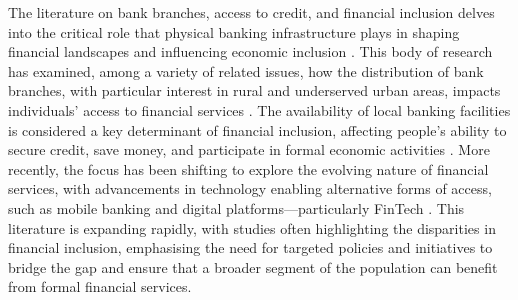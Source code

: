 \documentclass[a4paper,11pt,oneside]{article}
\begin{document}



The literature on bank branches, access to credit, and financial inclusion delves into the critical role that physical banking infrastructure plays in shaping financial landscapes and influencing economic inclusion \citep{avery1991deregulation,beck_demirguc_maksimovic_jmcb,jayartne-strahan-qje96,ergungor2010bank,Brevoort2009,crosignani2025financial}. This body of research has examined, among a variety of related issues, how the distribution of bank branches, with particular interest in rural and underserved urban areas, impacts individuals' access to financial services \citep{solo2006access,anderloni2007access}. The availability of local banking facilities is considered a key determinant of financial inclusion, affecting people's ability to secure credit, save money, and participate in formal economic activities \citep{sarma2011financial}. More recently, the focus has been shifting to explore the evolving nature of financial services, with advancements in technology enabling alternative forms of access, such as mobile banking and digital platforms---particularly FinTech \citep{demir2020fintech,rossi2021financial,wojcik2021financial}. This literature is expanding rapidly, with studies often highlighting the disparities in financial inclusion, emphasising the need for targeted policies and initiatives to bridge the gap and ensure that a broader segment of the population can benefit from formal financial services.
\end{document}

